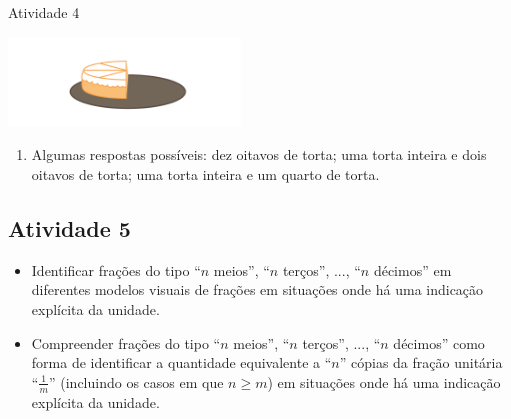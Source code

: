 \begin{multicols}{2}
\begin{resposta*}{Atividade 4}
  \begin{center}
  \includegraphics[width=175pt, keepaspectratio]{../figuras/licao02/ativ3_resposta.png}
  \end{center}

\begin{enumerate} [\quad a)] %
    \item       Algumas respostas possíveis: dez oitavos de torta;  uma torta inteira e dois oitavos de torta; uma torta inteira e um quarto de torta.
\end{enumerate} %

\end{resposta*}



\subsection{Atividade 5}

   \vspace{.1cm}

\begin{itemize} %
    \item       Identificar frações do tipo       ``$n$ meios'',       ``$n$ terços'', ...,       ``$n$ décimos''     em diferentes modelos visuais de frações em situações onde há uma indicação explícita da unidade.
    \item       Compreender frações do tipo       ``$n$ meios'',       ``$n$ terços'', ...,       ``$n$ décimos''     como forma de identificar a quantidade equivalente a ``$n$''     cópias da fração unitária       ``$\frac{1}{m}$''     (incluindo os casos em que $n \geq m$) em situações onde há uma indicação explícita da unidade.
\end{itemize} %


  \vspace{.1cm}

  \vspace{.1cm}


\end{multicols}
